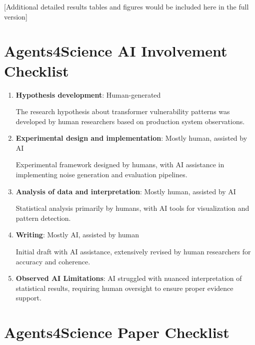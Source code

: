 \documentclass{article}
\begin{document}
[Additional detailed results tables and figures would be included here in the full version]

\newpage

\section*{Agents4Science AI Involvement Checklist}

\begin{enumerate}
    \item \textbf{Hypothesis development}: Human-generated

    The research hypothesis about transformer vulnerability patterns was developed by human researchers based on production system observations.

    \item \textbf{Experimental design and implementation}: Mostly human, assisted by AI

    Experimental framework designed by humans, with AI assistance in implementing noise generation and evaluation pipelines.

    \item \textbf{Analysis of data and interpretation}: Mostly human, assisted by AI

    Statistical analysis primarily by humans, with AI tools for visualization and pattern detection.

    \item \textbf{Writing}: Mostly AI, assisted by human

    Initial draft with AI assistance, extensively revised by human researchers for accuracy and coherence.

    \item \textbf{Observed AI Limitations}: AI struggled with nuanced interpretation of statistical results, requiring human oversight to ensure proper evidence support.
\end{enumerate}

\newpage

\section*{Agents4Science Paper Checklist}
\end{document}
